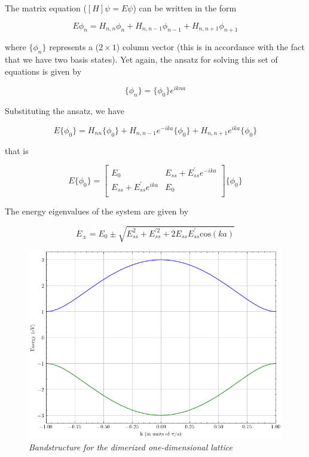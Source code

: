 The matrix equation ($[H]\psi = E\psi$) can be written in the form

\begin{equation*}
    E\phi_n = H_{n,n}\phi_n + H_{n,n-1}\phi_{n-1} + H_{n,n+1}\phi_{n+1}
\end{equation*}

where $\{\phi_{n}\}$ represents a ($2 \times 1$) column vector (this is in accordance with the fact that we have two basis states). Yet again, the ansatz for solving this set of equations is given by

\begin{equation*}
    \{\phi_n\} = \{\phi_0\}e^{ikna}
\end{equation*}

Substituting the ansatz, we have

\begin{equation*}
    E\{\phi_0\} = H_{nn}\{\phi_0\} + H_{n,n-1}e^{-ika}\{\phi_0\} + H_{n,n+1}e^{ika}\{\phi_0\}
\end{equation*}

that is

\begin{equation*}
E\{\phi_0\} =
\begin{bmatrix}
    E_0 & E_{ss}+E_{ss}^{'}e^{-ika} \\
    E_{ss}+E_{ss}^{'}e^{ika} & E_0 \\
\end{bmatrix} \{\phi_0\}
\end{equation*}

The energy eigenvalues of the system are given by

\begin{equation}
    E_{\pm} = E_0 \pm \sqrt{E_{ss}^{2}+E_{ss}^{'2}+2E_{ss}E_{ss}^{'}\text{cos}(ka)}
\end{equation}

\begin{figure}[h]
\centering
\includegraphics[scale=0.6]{ssh.png}
\caption{\textit{Bandstructure for the dimerized one-dimensional lattice}}
\end{figure}


